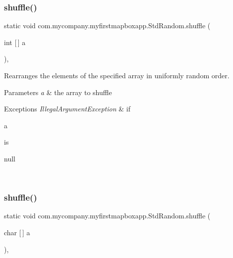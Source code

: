 \subsubsection{\texorpdfstring{shuffle()}{shuffle()}\hspace{0.1cm}{\footnotesize\ttfamily [3/7]}}
{\footnotesize\ttfamily static void com.\+mycompany.\+myfirstmapboxapp.\+Std\+Random.\+shuffle (\begin{DoxyParamCaption}\item[{int \mbox{[}$\,$\mbox{]}}]{a }\end{DoxyParamCaption})\hspace{0.3cm}{\ttfamily [inline]}, {\ttfamily [static]}}

Rearranges the elements of the specified array in uniformly random order.


\begin{DoxyParams}{Parameters}
{\em a} & the array to shuffle \\
\hline
\end{DoxyParams}

\begin{DoxyExceptions}{Exceptions}
{\em Illegal\+Argument\+Exception} & if
\begin{DoxyCode}
a 
\end{DoxyCode}
 is
\begin{DoxyCode}
null 
\end{DoxyCode}
 \\
\hline
\end{DoxyExceptions}
\mbox{\label{classcom_1_1mycompany_1_1myfirstmapboxapp_1_1_std_random_a368b7c084499c8d1309b778185bbec7e}} 
\subsubsection{\texorpdfstring{shuffle()}{shuffle()}\hspace{0.1cm}{\footnotesize\ttfamily [4/7]}}
{\footnotesize\ttfamily static void com.\+mycompany.\+myfirstmapboxapp.\+Std\+Random.\+shuffle (\begin{DoxyParamCaption}\item[{char \mbox{[}$\,$\mbox{]}}]{a }\end{DoxyParamCaption})\hspace{0.3cm}{\ttfamily [inline]}, {\ttfamily [static]}}

